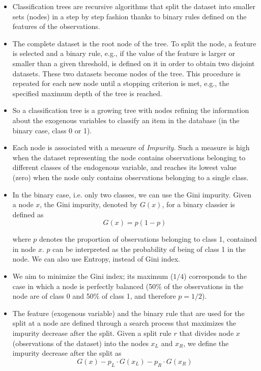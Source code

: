 \begin{itemize}
    \item Classification trees are recursive algorithms that split the dataset into smaller sets (nodes) in a step by step fashion thanks to binary rules defined on the features of the observations. 
    \item The complete dataset is the root node of the tree. To split the node, a feature is selected and a binary rule, e.g., if the value of the feature is larger or smaller than a given threshold, is defined on it in order to obtain two disjoint datasets. These two datasets become nodes of the tree. This procedure is repeated for each new node until a stopping criterion is met, e.g., the specified maximum depth of the tree is reached. 
    \item So a classification tree is a growing tree with nodes refining the information about the exogenous variables to classify an item in the database (in the binary case, class 0 or 1). 
    \item Each node is associated with a measure of \textit{Impurity}. Such a measure is high when the dataset representing the node contains observations belonging to different classes of the endogenous variable, and reaches its lowest value (zero) when the node only contains observations belonging to a single class.
    \item In the binary case, i.e. only two classes, we can use the Gini impurity. Given a node $x$, the Gini impurity, denoted by $G( x)$, for a binary classier is defined as
          \begin{equation*}
              G( x) =p( 1-p)
          \end{equation*}
          
          where $p$ denotes the proportion of observations belonging to class 1, contained in node $x$. $p$ can be interpreted as the probability of being of class 1 in the node. We can also use Entropy, instead of Gini index.
    \item We aim to minimize the Gini index; its maximum ($1/4$) corresponds to the case in which a node is perfectly balanced (50\% of the observations in the node are of class 0 and 50\% of class 1, and therefore $p=1/2$).
    \item The feature (exogenous variable) and the binary rule that are used for the split at a node are defined through a search process that maximizes the impurity decrease after the split. Given a split rule $r$ that divides node $x$ (observations of the dataset) into the nodes $x_{L}$ and $x_{R}$, we define the impurity decrease after the split as
          \begin{equation*}
              G\left( x\right) -p_{L} \cdot G\left( x_{L}\right) -p_{R} \cdot G\left( x_{R}\right)
          \end{equation*}
          

\end{itemize}

